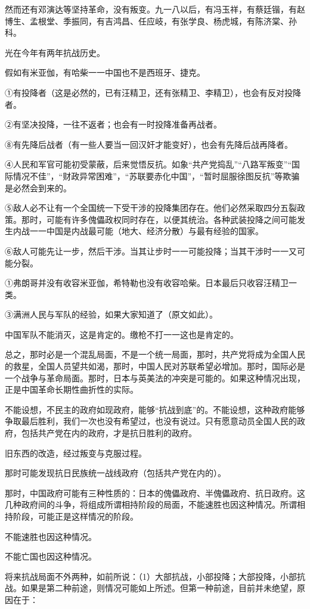 然而还有邓演达等坚持革命，没有叛变。九一八以后，有冯玉祥，有蔡廷锴，有赵博生、孟根堂、季振同，有吉鸿昌、任应岐，有张学良、杨虎城，有陈济棠、孙科。

光在今年有两年抗战历史。

假如有米亚伽，有哈柴一一中国也不是西班牙、捷克。

①有投降者（这是必然的，已有汪精卫，还有张精卫、李精卫），也会有反对投降者。

②有坚决投降，一往不返者；也会有一时投降准备再战者。

⑧有先降后战者（有一些人要当一回汉奸才能变好），也会有先降后战再降者。

④人民和军官可能初受蒙蔽，后来觉悟反抗。如象“共产党捣乱”“八路军叛变”“国际情况不佳”，“财政异常困难”，“苏联要赤化中国”，“暂时屈服徐图反抗”等欺骗是必然会到来的。

⑤敌人必不让有一个全国统一下受干涉的投降集团存在。他们必然采取四分五裂政策。那时，可能有许多傀儡政权同时存在，以便其统治。各种武装投降之间可能发生内战一一中国是内战最可能（地大、经济分散）与最有经验的国家。

⑥敌人可能先让一步，然后干涉。当其让步时一一可能投降；当其干涉时一一又可能分裂。

①弗朗哥并没有收容米亚伽，希特勒也没有收容哈柴。日本最后只收容汪精卫一类。

③满洲人民与军队的经验，如果大家知道了（原文如此）。

中国军队不能消灭，这是肯定的。缴枪不打一一这也是肯定的。

总之，那时必是一个混乱局面，不是一个统一局面，那时，共产党将成为全国人民的救星，全国人员望共如渴，那时，中国人民对苏联希望必增加。那时，国际必是一个战争与革命局面。那时，日本与英美法的冲突是可能的。如果这种情况出现，正是中国革命长期性曲折性的实际。

不能设想，不民主的政府如现政府，能够“抗战到底”的。不能设想，这种政府能够争取最后胜利，我们一次也没有希望过，也没有说过。只有愿意动员全国人民的政府，包括共产党在内的政府，才是抗日胜利的政府。

旧东西的改造，经过叛变与克服过程。

那时可能发现抗日民族统一战线政府（包括共产党在内的）。

那时，中国政府可能有三种性质的：日本的傀儡政府、半傀儡政府、抗日政府。这几种政府间的斗争，将组成所谓相持阶段的局面，不能速胜也因这种情况。所谓相持阶段，可能正是这样情况的阶段。

不能速胜也因这种情况。

不能亡国也因这种情况。

将来抗战局面不外两种，如前所说：（1）大部抗战，小部投降；大部投降，小部抗战。如果是第二种前途，则情况可能如上所述。但第一种前途，目前并未绝望，原因在于：

